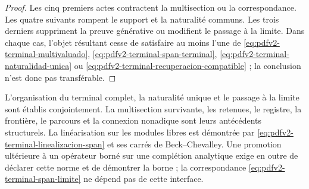 \begin{proof}
Les cinq premiers actes contractent la multisection ou la correspondance. Les quatre suivants rompent le support et la naturalité communs. Les trois derniers suppriment la preuve générative ou modifient le passage à la limite. Dans chaque cas, l'objet résultant cesse de satisfaire au moins l'une de \eqref{eq:pdfv2-terminal-multivaluado}, \eqref{eq:pdfv2-terminal-span-terminal}, \eqref{eq:pdfv2-terminal-naturalidad-unica} ou \eqref{eq:pdfv2-terminal-recuperacion-compatible} ; la conclusion n'est donc pas transférable.
\end{proof}

\begin{statusbox}
L'organisation du terminal complet, la naturalité unique et le passage à la limite sont établis conjointement. La multisection survivante, les retenues, le registre, la frontière, le parcours et la connexion nonadique sont leurs antécédents structurels.\quad
La linéarisation sur les modules libres est démontrée par \eqref{eq:pdfv2-terminal-linealizacion-span} et ses carrés de Beck--Chevalley. Une promotion ultérieure à un opérateur borné sur une complétion analytique exige en outre de déclarer cette norme et de démontrer la borne ; la correspondance \eqref{eq:pdfv2-terminal-span-limite} ne dépend pas de cette interface.
\end{statusbox}

